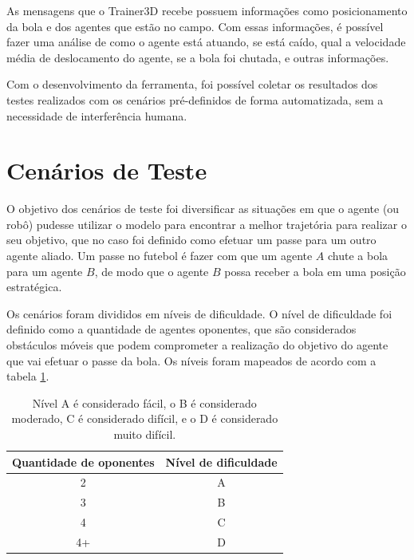As mensagens que o Trainer3D recebe possuem informações como posicionamento da bola e dos agentes que estão no campo. Com 
essas informações, é possível fazer uma análise de como o agente está atuando, se está caído, qual a velocidade média de deslocamento 
do agente, se a bola foi chutada, e outras informações.

Com o desenvolvimento da ferramenta, foi possível coletar os resultados dos testes realizados com os cenários pré-definidos de forma 
automatizada, sem a necessidade de interfer\^encia humana.

\section{Cenários de Teste}
\label{sec:cenarios}
O objetivo dos cenários de teste foi diversificar as situações em que o agente (ou robô) pudesse utilizar o modelo para encontrar
a melhor trajetória para realizar o seu objetivo, que no caso foi definido como efetuar um passe para um outro agente aliado. Um 
passe no futebol é fazer com que um agente $A$ chute a bola para um agente $B$, de modo que o agente $B$ possa receber a bola em 
uma posição estratégica.

Os cenários foram divididos em níveis de dificuldade. O nível de dificuldade foi definido como a quantidade de agentes oponentes, 
que são considerados obstáculos móveis que podem comprometer a realização do objetivo do agente que vai efetuar o passe da bola. Os 
níveis foram mapeados de acordo com a tabela \ref{tab:niveisDificuldade}.

\begin{table}[!htb]


\centering

\caption{Nível A é considerado fácil, o B é considerado moderado, C é considerado difícil, e o D é considerado muito difícil.}

  \begin{tabular}{|c|c|}
    \hline
    Quantidade de oponentes & Nível de dificuldade \\ \hline
    2  & A \\ \hline
    3  & B \\ \hline
    4  & C \\ \hline
    4+ & D \\ \hline
  \end{tabular}

  \label{tab:niveisDificuldade}
\end{table}


